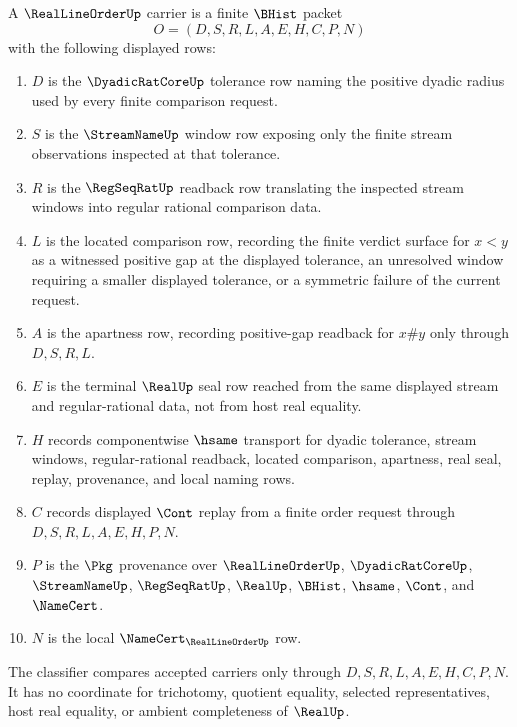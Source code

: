 \begin{definition}
\label{def:real-line-order-carrier}
A $\RealLineOrderUp$ carrier is a finite $\BHist$ packet
$$
O=(D,S,R,L,A,E,H,C,P,N)
$$
with the following displayed rows:
\begin{enumerate}
\item $D$ is the $\DyadicRatCoreUp$ tolerance row naming the positive dyadic radius used by every finite comparison request.
\item $S$ is the $\StreamNameUp$ window row exposing only the finite stream observations inspected at that tolerance.
\item $R$ is the $\RegSeqRatUp$ readback row translating the inspected stream windows into regular rational comparison data.
\item $L$ is the located comparison row, recording the finite verdict surface for $x<y$ as a witnessed positive gap at the displayed tolerance, an unresolved window requiring a smaller displayed tolerance, or a symmetric failure of the current request.
\item $A$ is the apartness row, recording positive-gap readback for $x\# y$ only through $D,S,R,L$.
\item $E$ is the terminal $\RealUp$ seal row reached from the same displayed stream and regular-rational data, not from host real equality.
\item $H$ records componentwise $\hsame$ transport for dyadic tolerance, stream windows, regular-rational readback, located comparison, apartness, real seal, replay, provenance, and local naming rows.
\item $C$ records displayed $\Cont$ replay from a finite order request through $D,S,R,L,A,E,H,P,N$.
\item $P$ is the $\Pkg$ provenance over $\RealLineOrderUp$, $\DyadicRatCoreUp$, $\StreamNameUp$, $\RegSeqRatUp$, $\RealUp$, $\BHist$, $\hsame$, $\Cont$, and $\NameCert$.
\item $N$ is the local $\NameCert_{\RealLineOrderUp}$ row.
\end{enumerate}
The classifier compares accepted carriers only through $D,S,R,L,A,E,H,C,P,N$. It has no coordinate for trichotomy, quotient equality, selected representatives, host real equality, or ambient completeness of $\RealUp$.
\end{definition}

